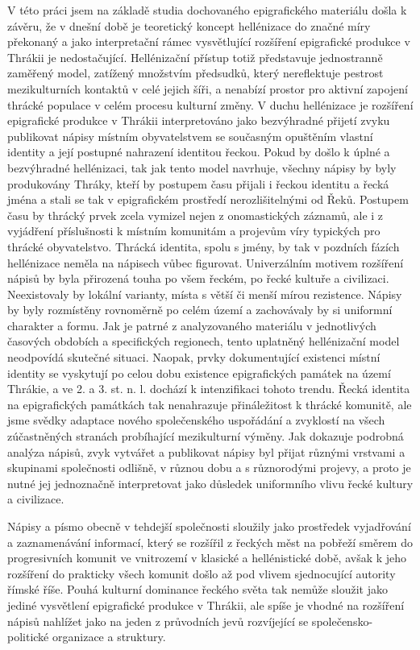 V této práci jsem na základě studia dochovaného epigrafického materiálu došla k závěru, že v dnešní době je teoretický koncept hellénizace do značné míry překonaný a jako interpretační rámec vysvětlující rozšíření epigrafické produkce v Thrákii je nedostačující. Hellénizační přístup totiž představuje jednostranně zaměřený model, zatížený množstvím předsudků, který nereflektuje pestrost mezikulturních kontaktů v celé jejich šíři, a nenabízí prostor pro aktivní zapojení thrácké populace v celém procesu kulturní změny. V duchu hellénizace je rozšíření epigrafické produkce v Thrákii interpretováno jako bezvýhradné přijetí zvyku publikovat nápisy místním obyvatelstvem se současným opuštěním vlastní identity a její postupné nahrazení identitou řeckou. Pokud by došlo k úplné a bezvýhradné hellénizaci, tak jak tento model navrhuje, všechny nápisy by byly produkovány Thráky, kteří by postupem času přijali i řeckou identitu a řecká jména a stali se tak v epigrafickém prostředí nerozlišitelnými od Řeků. Postupem času by thrácký prvek zcela vymizel nejen z onomastických záznamů, ale i z vyjádření příslušnosti k místním komunitám a projevům víry typických pro thrácké obyvatelstvo. Thrácká identita, spolu s jmény, by tak v pozdních fázích hellénizace neměla na nápisech vůbec figurovat. Univerzálním motivem rozšíření nápisů by byla přirozená touha po všem řeckém, po řecké kultuře a civilizaci. Neexistovaly by lokální varianty, místa s větší či menší mírou rezistence. Nápisy by byly rozmístěny rovnoměrně po celém území a zachovávaly by si uniformní charakter a formu. Jak je patrné z analyzovaného materiálu v jednotlivých časových obdobích a specifických regionech, tento uplatněný hellénizační model neodpovídá skutečné situaci. Naopak, prvky dokumentující existenci místní identity se vyskytují po celou dobu existence epigrafických památek na území Thrákie, a ve 2. a 3. st. n. l. dochází k intenzifikaci tohoto trendu. Řecká identita na epigrafických památkách tak nenahrazuje přináležitost k thrácké komunitě, ale jsme svědky adaptace nového společenského uspořádání a zvyklostí na všech zúčastněných stranách probíhající mezikulturní výměny. Jak dokazuje podrobná analýza nápisů, zvyk vytvářet a publikovat nápisy byl přijat různými vrstvami a skupinami společnosti odlišně, v různou dobu a s různorodými projevy, a proto je nutné jej jednoznačně interpretovat jako důsledek uniformního vlivu řecké kultury a civilizace.

Nápisy a písmo obecně v tehdejší společnosti sloužily jako prostředek vyjadřování a zaznamenávání informací, který se rozšířil z řeckých měst na pobřeží směrem do progresivních komunit ve vnitrozemí v klasické a hellénistické době, avšak k jeho rozšíření do prakticky všech komunit došlo až pod vlivem sjednocující autority římské říše. Pouhá kulturní dominance řeckého světa tak nemůže sloužit jako jediné vysvětlení epigrafické produkce v Thrákii, ale spíše je vhodné na rozšíření nápisů nahlížet jako na jeden z průvodních jevů rozvíjející se společensko-politické organizace a struktury.

